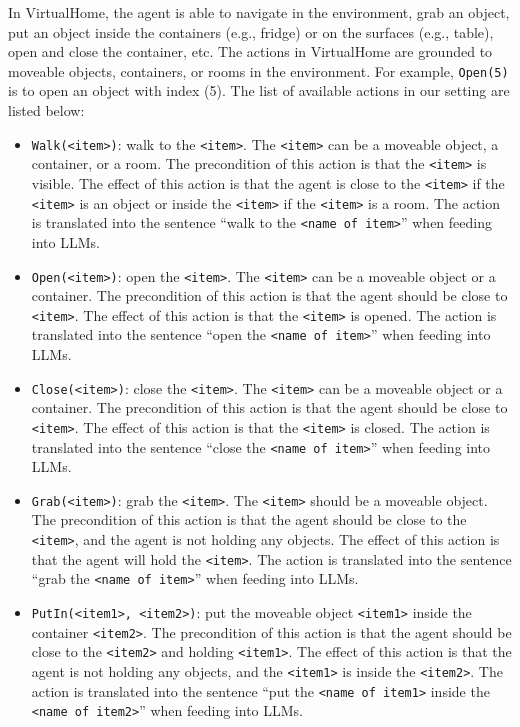 In VirtualHome, the agent is able to navigate in the environment, grab an object, put an object inside the containers (e.g., fridge) or on the surfaces (e.g., table), open and close the container, etc. The actions in VirtualHome are grounded to moveable objects, containers, or rooms in the environment. For example, \texttt{Open(5)} is to open an object with index (5). The list of available actions in our setting are listed below:
\begin{itemize}
    \item \texttt{Walk(<item>)}: walk to the \texttt{<item>}. The \texttt{<item>} can be a moveable object, a container, or a room. The precondition of this action is that the \texttt{<item>} is visible. The effect of this action is that the agent is close to the \texttt{<item>} if the \texttt{<item>} is an object or inside the \texttt{<item>} if the \texttt{<item>} is a room. The action is translated into the sentence ``walk to the \texttt{<name of item>}'' when feeding into LLMs. 
    \item \texttt{Open(<item>)}: open the \texttt{<item>}. The \texttt{<item>} can be a moveable object or a container. The precondition of this action is that the agent should be close to \texttt{<item>}. The effect of this action is that the \texttt{<item>} is opened. The action is translated into the sentence ``open the \texttt{<name of item>}'' when feeding into LLMs.
    \item \texttt{Close(<item>)}: close the \texttt{<item>}. The \texttt{<item>} can be a moveable object or a container. The precondition of this action is that the agent should be close to \texttt{<item>}. The effect of this action is that the \texttt{<item>} is closed. The action is translated into the sentence ``close the \texttt{<name of item>}'' when feeding into LLMs.
    \item \texttt{Grab(<item>)}: grab the \texttt{<item>}. The \texttt{<item>} should be a moveable object. The precondition of this action is that the agent should be close to the \texttt{<item>}, and the agent is not holding any objects. The effect of this action is that the agent will hold the \texttt{<item>}. The action is translated into the sentence ``grab the \texttt{<name of item>}'' when feeding into LLMs.
    \item \texttt{PutIn(<item1>, <item2>)}: put the moveable object \texttt{<item1>} inside the container \texttt{<item2>}. The precondition of this action is that the agent should be close to the \texttt{<item2>} and holding \texttt{<item1>}. The effect of this action is that the agent is not holding any objects, and the \texttt{<item1>} is inside the \texttt{<item2>}. The action is translated into the sentence ``put the \texttt{<name of item1>} inside the \texttt{<name of item2>}'' when feeding into LLMs.

\end{itemize}
